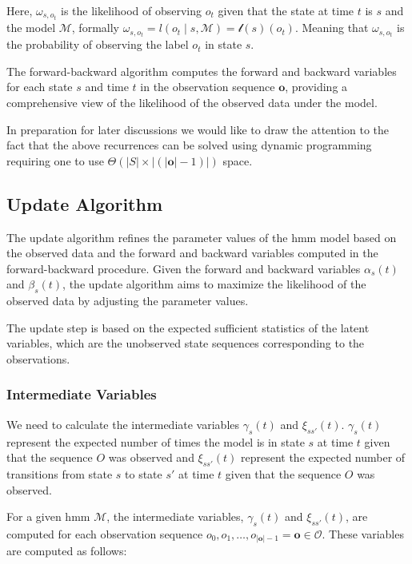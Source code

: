 Here, $\omega_{s, o_t}$ is the likelihood of observing $o_t$ given that the state at time $t$ is $s$ and the model $\mathcal{M}$, formally $\omega_{s, o_t} = l(o_t \mid s, \mathcal{M}) = \mathscr{l}(s)(o_t)$.
Meaning that $\omega_{s, o_t}$ is the probability of observing the label $o_t$ in state $s$.

The forward-backward algorithm computes the forward and backward variables for each state $s$ and time $t$ in the observation sequence $\mathbf{o}$, providing a comprehensive view of the likelihood of the observed data under the model.

In preparation for later discussions we would like to draw the attention to the fact that the above recurrences can be solved using dynamic programming requiring one to use $\Theta(|S|\times|(|\mathbf{o}|-1)|)$ space.

\subsection{Update Algorithm}\label{subsec:update-algorithm}
The update algorithm refines the parameter values of the \gls{hmm} model based on the observed data and the forward and backward variables computed in the forward-backward procedure.
Given the forward and backward variables $\alpha_s(t)$ and $\beta_s(t)$, the update algorithm aims to maximize the likelihood of the observed data by adjusting the parameter values.

The update step is based on the expected sufficient statistics of the latent variables, which are the unobserved state sequences corresponding to the observations.

\subsubsection{Intermediate Variables}
We need to calculate the intermediate variables $\gamma_s(t)$ and $\xi_{ss'}(t)$.
$\gamma_s(t)$ represent the expected number of times the model is in state $s$ at time $t$ given that the sequence $O$ was observed and $\xi_{ss'}(t)$ represent the expected number of transitions from state $s$ to state $s'$ at time $t$ given that the sequence $O$ was observed.

For a given \gls{hmm} $\mathcal{M}$, the intermediate variables, $\gamma_s(t)$ and $\xi_{ss'}(t)$, are computed for each observation sequence $o_0, o_1, \dots, o_{|\mathbf{o}|-1} = \mathbf{o} \in \mathcal{O}$.
These variables are computed as follows:

